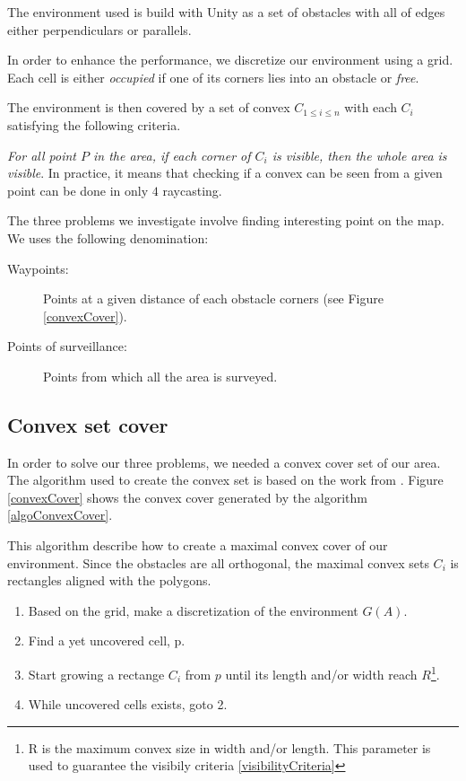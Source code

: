 The environment used is build with Unity as a set of obstacles with all of edges either perpendiculars or parallels.

In order to enhance the performance, we discretize our environment using a grid. Each cell is either \emph{occupied} if one of its corners lies into an obstacle or \emph{free}.

The environment is then covered by a set of convex $C_{1\leq i \leq n}$ with each $C_i$ satisfying the following criteria.

\begin{criteria}[of Visibility]
 \emph{For all point $P$ in the area, if each corner of $C_i$ is visible, then the whole area is visible}. In practice, it means that checking if a convex can be seen from a given point can be done in only $4$ raycasting.
\label{visibilityCriteria}
\end{criteria}

The three problems we investigate involve finding interesting point on the map. We uses the following denomination:
\begin{description}
	\item[Waypoints:] Points at a given distance of each obstacle corners (see Figure \ref{convexCover}).
	\item[Points of surveillance:] Points from which all the area is surveyed.
\end{description}

\subsection{Convex set cover}

In order to solve our three problems, we needed a convex cover set of our area. The algorithm used to create the convex set is based on the work from \cite{CoopMinTime}. Figure \ref{convexCover} shows the convex cover generated by the algorithm \ref{algoConvexCover}.

\begin{algorithm}
This algorithm describe how to create a maximal convex cover of our environment. Since the obstacles are all orthogonal, the maximal convex sets $C_i$ is rectangles aligned with the polygons.
\begin{enumerate}
\item Based on the grid, make a discretization of the environment $G(A)$.
\item Find a yet uncovered cell, p.
\item Start growing a rectange $C_i$ from $p$ until its length and/or width reach $R$\footnote{R is the maximum convex size in width and/or length. This parameter is used to guarantee the visibily criteria \ref{visibilityCriteria}}.
\item While uncovered cells exists, goto 2.
\end{enumerate}
\label{algoConvexCover}
\end{algorithm}

